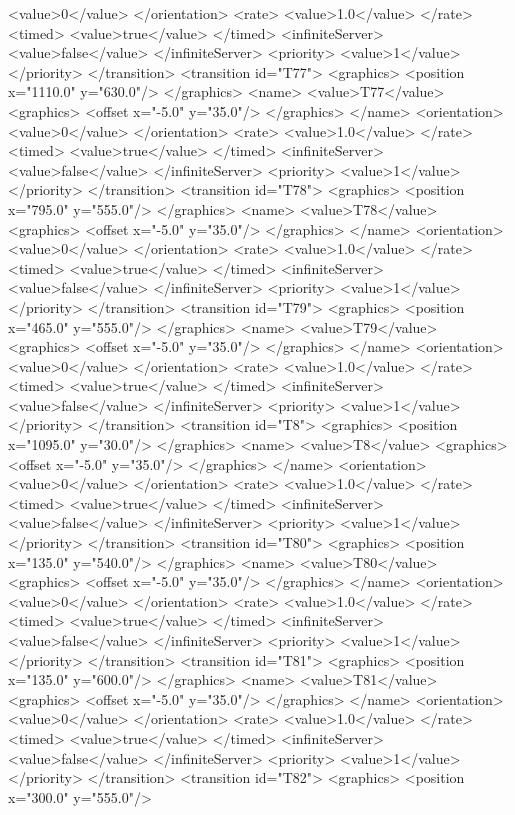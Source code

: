 <value>0</value>
</orientation>
<rate>
<value>1.0</value>
</rate>
<timed>
<value>true</value>
</timed>
<infiniteServer>
<value>false</value>
</infiniteServer>
<priority>
<value>1</value>
</priority>
</transition>
<transition id="T77">
<graphics>
<position x="1110.0" y="630.0"/>
</graphics>
<name>
<value>T77</value>
<graphics>
<offset x="-5.0" y="35.0"/>
</graphics>
</name>
<orientation>
<value>0</value>
</orientation>
<rate>
<value>1.0</value>
</rate>
<timed>
<value>true</value>
</timed>
<infiniteServer>
<value>false</value>
</infiniteServer>
<priority>
<value>1</value>
</priority>
</transition>
<transition id="T78">
<graphics>
<position x="795.0" y="555.0"/>
</graphics>
<name>
<value>T78</value>
<graphics>
<offset x="-5.0" y="35.0"/>
</graphics>
</name>
<orientation>
<value>0</value>
</orientation>
<rate>
<value>1.0</value>
</rate>
<timed>
<value>true</value>
</timed>
<infiniteServer>
<value>false</value>
</infiniteServer>
<priority>
<value>1</value>
</priority>
</transition>
<transition id="T79">
<graphics>
<position x="465.0" y="555.0"/>
</graphics>
<name>
<value>T79</value>
<graphics>
<offset x="-5.0" y="35.0"/>
</graphics>
</name>
<orientation>
<value>0</value>
</orientation>
<rate>
<value>1.0</value>
</rate>
<timed>
<value>true</value>
</timed>
<infiniteServer>
<value>false</value>
</infiniteServer>
<priority>
<value>1</value>
</priority>
</transition>
<transition id="T8">
<graphics>
<position x="1095.0" y="30.0"/>
</graphics>
<name>
<value>T8</value>
<graphics>
<offset x="-5.0" y="35.0"/>
</graphics>
</name>
<orientation>
<value>0</value>
</orientation>
<rate>
<value>1.0</value>
</rate>
<timed>
<value>true</value>
</timed>
<infiniteServer>
<value>false</value>
</infiniteServer>
<priority>
<value>1</value>
</priority>
</transition>
<transition id="T80">
<graphics>
<position x="135.0" y="540.0"/>
</graphics>
<name>
<value>T80</value>
<graphics>
<offset x="-5.0" y="35.0"/>
</graphics>
</name>
<orientation>
<value>0</value>
</orientation>
<rate>
<value>1.0</value>
</rate>
<timed>
<value>true</value>
</timed>
<infiniteServer>
<value>false</value>
</infiniteServer>
<priority>
<value>1</value>
</priority>
</transition>
<transition id="T81">
<graphics>
<position x="135.0" y="600.0"/>
</graphics>
<name>
<value>T81</value>
<graphics>
<offset x="-5.0" y="35.0"/>
</graphics>
</name>
<orientation>
<value>0</value>
</orientation>
<rate>
<value>1.0</value>
</rate>
<timed>
<value>true</value>
</timed>
<infiniteServer>
<value>false</value>
</infiniteServer>
<priority>
<value>1</value>
</priority>
</transition>
<transition id="T82">
<graphics>
<position x="300.0" y="555.0"/>
